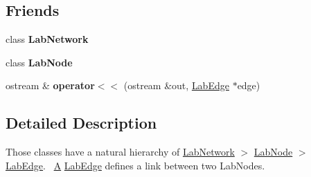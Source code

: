 \subsection*{Friends}
\begin{DoxyCompactItemize}
\item 
\hypertarget{classelps_1_1_lab_edge_a0a1eacd7b0485858d6720402ab709808}{class {\bfseries Lab\+Network}}\label{classelps_1_1_lab_edge_a0a1eacd7b0485858d6720402ab709808}

\item 
\hypertarget{classelps_1_1_lab_edge_ac56a76b904b641106cb3d628fdfe41ea}{class {\bfseries Lab\+Node}}\label{classelps_1_1_lab_edge_ac56a76b904b641106cb3d628fdfe41ea}

\item 
\hypertarget{classelps_1_1_lab_edge_abce9e793009cde1603b0c245bfa9567a}{ostream \& {\bfseries operator$<$$<$} (ostream \&out, \hyperlink{classelps_1_1_lab_edge}{Lab\+Edge} $\ast$edge)}\label{classelps_1_1_lab_edge_abce9e793009cde1603b0c245bfa9567a}

\end{DoxyCompactItemize}


\subsection{Detailed Description}
Those classes have a natural hierarchy of \hyperlink{classelps_1_1_lab_network}{Lab\+Network} $>$ \hyperlink{classelps_1_1_lab_node}{Lab\+Node} $>$ \hyperlink{classelps_1_1_lab_edge}{Lab\+Edge}.~\newline
 \hyperlink{class_a}{A} \hyperlink{classelps_1_1_lab_edge}{Lab\+Edge} defines a link between two Lab\+Nodes. 